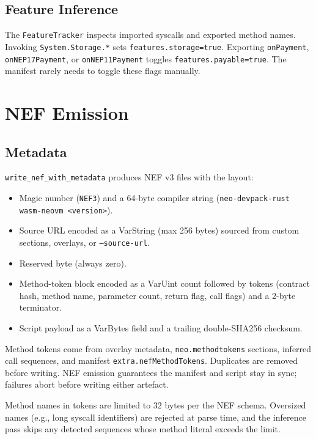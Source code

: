 \documentclass[11pt]{article}
\begin{document}
\subsection{Feature Inference}
The \texttt{FeatureTracker} inspects imported syscalls and exported method names. Invoking \texttt{System.Storage.*} sets \texttt{features.storage=true}. Exporting \texttt{onPayment}, \texttt{onNEP17Payment}, or \texttt{onNEP11Payment} toggles \texttt{features.payable=true}. The manifest rarely needs to toggle these flags manually.

\section{NEF Emission}
\subsection{Metadata}
\texttt{write\_nef\_with\_metadata} produces NEF v3 files with the layout:
\begin{itemize}[nosep]
    \item Magic number (\texttt{NEF3}) and a 64-byte compiler string (\texttt{neo-devpack-rust wasm-neovm <version>}).
    \item Source URL encoded as a VarString (max 256 bytes) sourced from custom sections, overlays, or \texttt{--source-url}.
    \item Reserved byte (always zero).
    \item Method-token block encoded as a VarUint count followed by tokens (contract hash, method name, parameter count, return flag, call flags) and a 2-byte terminator.
    \item Script payload as a VarBytes field and a trailing double-SHA256 checksum.
\end{itemize}
Method tokens come from overlay metadata, \texttt{neo.methodtokens} sections, inferred call sequences, and manifest \texttt{extra.nefMethodTokens}. Duplicates are removed before writing. NEF emission guarantees the manifest and script stay in sync; failures abort before writing either artefact.

Method names in tokens are limited to 32 bytes per the NEF schema. Oversized names (e.g., long syscall identifiers) are rejected at parse time, and the inference pass skips any detected sequences whose method literal exceeds the limit.
\end{document}
